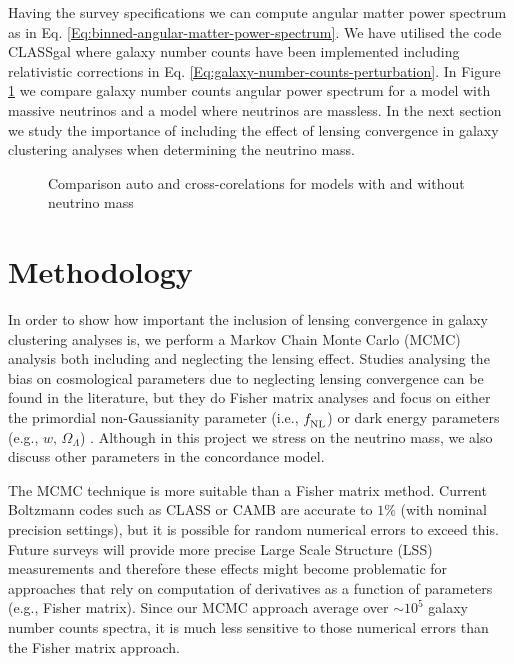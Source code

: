Having the survey specifications we can compute angular matter power spectrum as in Eq. \eqref{Eq:binned-angular-matter-power-spectrum}. We have utilised the code CLASSgal \cite{DiDio:2013bqa} where galaxy number counts have been implemented including relativistic corrections in Eq. \eqref{Eq:galaxy-number-counts-perturbation}. In Figure \ref{Fig:comparison-massive-massless-Cls} we compare galaxy number counts angular power spectrum for a model with massive neutrinos and a model where neutrinos are massless. In the next section we study the importance of including the effect of lensing convergence in galaxy clustering analyses when determining the neutrino mass. 

\begin{figure}[hbtp]
\centering
\caption{Comparison auto and cross-corelations for models with and without neutrino mass}
\label{Fig:comparison-massive-massless-Cls}
\end{figure}
 
\section{Methodology}
\label{chapter-mnu:methodology}

In order to show how important the inclusion of lensing convergence in galaxy clustering analyses is, we perform a Markov Chain Monte Carlo (MCMC) analysis \cite{Lewis:2002ah,Verde:2003ey,Tegmark:2003ud} both including and neglecting the lensing effect. Studies analysing the bias on cosmological parameters due to neglecting lensing convergence can be found in the literature, but they do Fisher matrix analyses and focus on either the primordial non-Gaussianity parameter (i.e., $f_{\rm NL}^{}$) \cite{Namikawa:2011yr} or dark energy parameters (e.g., $w,\, \Omega_\Lambda$) \cite{Duncan:2013haa}. Although in this project we stress on the neutrino mass, we also discuss other parameters in the concordance model.  

The MCMC technique is more suitable than a Fisher matrix method. Current Boltzmann codes such as CLASS \cite{Lesgourgues:2011re} or CAMB \cite{Lewis:1999bs} are accurate to $1\%$ (with nominal precision settings), but it is possible for random numerical errors to exceed this. Future surveys will provide more precise Large Scale Structure (LSS) measurements and therefore these effects might become problematic for approaches that rely on computation of derivatives as a function of parameters (e.g., Fisher matrix). Since our MCMC approach average over $\sim 10^5$ galaxy number counts spectra, it is much less sensitive to those numerical errors than the Fisher matrix approach. 

